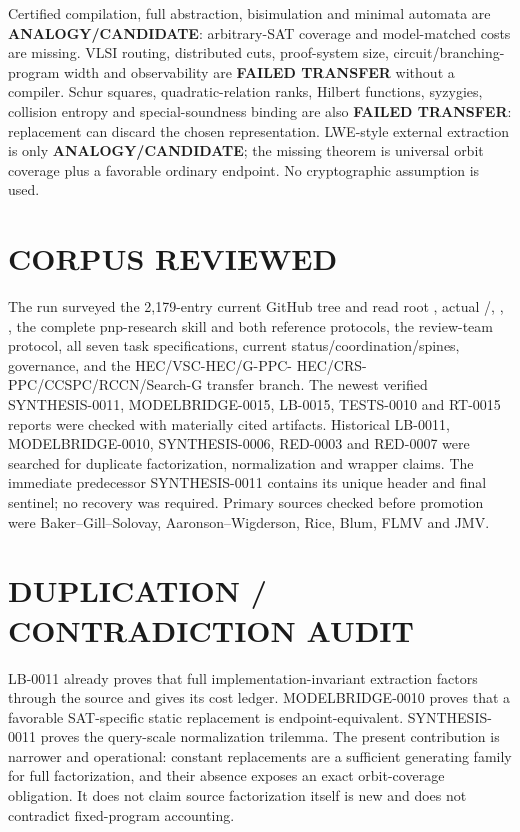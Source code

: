 \documentclass[11pt]{article}
\begin{document}
Certified compilation, full abstraction, bisimulation and minimal automata
are \textbf{ANALOGY/CANDIDATE}: arbitrary-SAT coverage and model-matched
costs are missing. VLSI routing, distributed cuts, proof-system size,
circuit/branching-program width and observability are \textbf{FAILED
TRANSFER} without a compiler. Schur squares, quadratic-relation ranks,
Hilbert functions, syzygies, collision entropy and special-soundness binding
are also \textbf{FAILED TRANSFER}: replacement can discard the chosen
representation. LWE-style external extraction is only
\textbf{ANALOGY/CANDIDATE}; the missing theorem is universal orbit coverage
plus a favorable ordinary endpoint. No cryptographic assumption is used.

\section{CORPUS REVIEWED}
The run surveyed the 2,179-entry current GitHub tree and read root
, actual /,
, , the complete pnp-research skill and both
reference protocols, the review-team protocol, all seven task specifications,
current status/coordination/spines, governance, and the HEC/VSC-HEC/G-PPC-
HEC/CRS-PPC/CCSPC/RCCN/Search-G transfer branch. The newest verified
SYNTHESIS-0011, MODELBRIDGE-0015, LB-0015, TESTS-0010 and RT-0015 reports
were checked with materially cited artifacts. Historical LB-0011,
MODELBRIDGE-0010, SYNTHESIS-0006, RED-0003 and RED-0007 were searched for
duplicate factorization, normalization and wrapper claims. The immediate
predecessor SYNTHESIS-0011 contains its unique header and final sentinel;
no recovery was required. Primary sources checked before promotion were
Baker--Gill--Solovay, Aaronson--Wigderson, Rice, Blum, FLMV and JMV.

\section{DUPLICATION / CONTRADICTION AUDIT}
LB-0011 already proves that full implementation-invariant extraction factors
through the source and gives its cost ledger. MODELBRIDGE-0010 proves that a
favorable SAT-specific static replacement is endpoint-equivalent.
SYNTHESIS-0011 proves the query-scale normalization trilemma. The present
contribution is narrower and operational: constant replacements are a
sufficient generating family for full factorization, and their absence
exposes an exact orbit-coverage obligation. It does not claim source
factorization itself is new and does not contradict fixed-program accounting.
\end{document}
